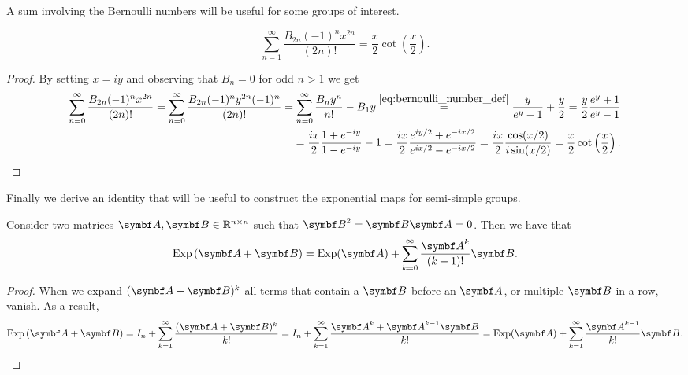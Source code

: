 A sum involving the Bernoulli numbers will be useful for some groups of interest.
\begin{proposition}
  \begin{equation}
    \label{eq:bernoulli_cot}
    \sum_{n = 1}^{\infty} \frac{B_{2n} (-1)^n x^{2n}}{(2n)!} = \frac{x}{2} \cot \left(\frac{x}{2}\right).
  \end{equation}
\end{proposition}
\begin{proof}
  By setting $x = iy$ and observing that $B_n = 0$ for odd $n > 1$ we get
  \begin{equation}
    \begin{aligned}
      \sum_{n=0}^\infty \frac{B_{2n} (-1)^n x^{2n}}{(2n)!} = \sum_{n=0}^\infty \frac{B_{2n} (-1)^n y^{2n} (-1)^n}{(2n)!} = \sum_{n=0}^\infty \frac{B_n y^n}{n!} - B_1 y \overset{\eqref{eq:bernoulli_number_def}} = \frac{y}{e^y - 1} + \frac{y}{2}
      = \frac{y}{2} \frac{e^y + 1 }{e^y - 1} \\
      = \frac{ix}{2} \frac{1 + e^{-iy}}{1 - e^{-iy}} - 1 = \frac{ix}{2} \frac{e^{iy / 2} + e^{-ix/2}}{e^{ix/2} - e^{-ix/2}} = \frac{ix}{2} \frac{\cos (x / 2)}{i \sin(x / 2)} = \frac{x}{2} \cot \left( \frac{x}{2} \right).
    \end{aligned}
  \end{equation}
\end{proof}

Finally we derive an identity that will be useful to construct the exponential maps for semi-simple groups.
\begin{lemma}
  \label{lem:help_exp}
  Consider two matrices $\A , \B \in \mathbb{R}^{n \times n}$ such that $\B^2 = \B\A = 0$. Then we have that
  \begin{equation}
    \Exp \left( \A + \B \right) = \Exp(\A) + \sum\limits_{k = 0}^\infty \frac{\A^{k}}{(k+1)!} \B.
  \end{equation}
\end{lemma}
\begin{proof}
  When we expand $(\A+\B)^k$ all terms that contain a $\B$ before an $\A$, or multiple $\B$ in a row, vanish. As a result,
  \begin{equation}
    \Exp \left( \A + \B \right) = I_n + \sum\limits_{k=1}^\infty \frac{(\A+\B)^k}{k!} = I_n + \sum\limits_{k=1}^\infty \frac{\A^k + \A^{k-1}\B }{k!} = \Exp(\A) + \sum\limits_{k=1}^\infty \frac{\A^{k-1}}{k!} \B.
  \end{equation}
\end{proof}

